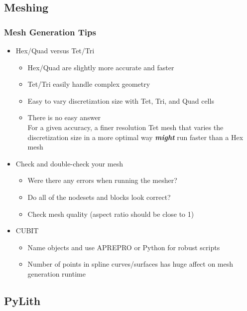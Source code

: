 \documentclass{beamer}
\begin{document}
\subsection{Meshing}

\begin{frame}
  \frametitle{Mesh Generation Tips}
 
  \begin{itemize}
  \item Hex/Quad versus Tet/Tri
    \begin{itemize}
    \item Hex/Quad are slightly more accurate and faster
    \item Tet/Tri easily handle complex geometry
    \item Easy to vary discretization size with Tet, Tri, and Quad cells
    \item There is no easy answer\\
      For a given accuracy, a finer resolution Tet mesh that varies
      the discretization size in a more optimal way {\bf\it might} run
      faster than a Hex mesh
    \end{itemize}
  \item Check and double-check your mesh
    \begin{itemize}
    \item Were there any errors when running the mesher?
    \item Do all of the nodesets and blocks look correct?
    \item Check mesh quality (aspect ratio should be close to 1)
    \end{itemize}
  \item CUBIT
    \begin{itemize}
    \item Name objects and use APREPRO or Python for robust scripts
    \item Number of points in spline curves/surfaces has huge affect
      on mesh generation runtime
    \end{itemize}
  \end{itemize}

\end{frame}


\subsection{PyLith}
\end{document}
